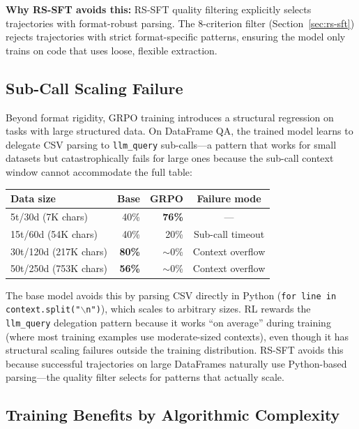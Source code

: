 \documentclass{article}
\begin{document}
\textbf{Why RS-SFT avoids this:} RS-SFT quality filtering explicitly selects trajectories with format-robust parsing. The 8-criterion filter (Section~\ref{sec:rs-sft}) rejects trajectories with strict format-specific patterns, ensuring the model only trains on code that uses loose, flexible extraction.

\subsection{Sub-Call Scaling Failure}
\label{sec:scaling-failure}

Beyond format rigidity, GRPO training introduces a structural regression on tasks with large structured data. On DataFrame QA, the trained model learns to delegate CSV parsing to \texttt{llm\_query} sub-calls---a pattern that works for small datasets but catastrophically fails for large ones because the sub-call context window cannot accommodate the full table:

\begin{center}
\begin{small}
\begin{tabular}{lrrc}
\toprule
Data size & Base & GRPO & Failure mode \\
\midrule
5t/30d (7K chars)    & 40\% & \textbf{76\%} & --- \\
15t/60d (54K chars)  & 40\% & 20\% & Sub-call timeout \\
30t/120d (217K chars) & \textbf{80\%} & $\sim$0\% & Context overflow \\
50t/250d (753K chars) & \textbf{56\%} & $\sim$0\% & Context overflow \\
\bottomrule
\end{tabular}
\end{small}
\end{center}

The base model avoids this by parsing CSV directly in Python (\texttt{for line in context.split("$\backslash$n")}), which scales to arbitrary sizes. RL rewards the \texttt{llm\_query} delegation pattern because it works ``on average'' during training (where most training examples use moderate-sized contexts), even though it has structural scaling failures outside the training distribution. RS-SFT avoids this because successful trajectories on large DataFrames naturally use Python-based parsing---the quality filter selects for patterns that actually scale.

\subsection{Training Benefits by Algorithmic Complexity}
\label{sec:complexity-main}
\end{document}

